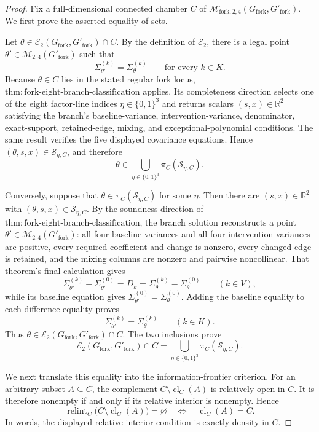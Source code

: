 \documentclass{article}
\begin{document}
\begin{proof}
Fix a full-dimensional connected chamber \(C\) of
\(\mathcal M^{\circ}_{\mathrm{fork},2,4}(G_{\mathrm{fork}},G'_{\mathrm{fork}})\).
We first prove the asserted equality of sets.

Let
\(\theta\in\mathcal E_2(G_{\mathrm{fork}},G'_{\mathrm{fork}})\cap C\).
By the definition of \(\mathcal E_2\), there is a legal point
\(\theta'\in\mathcal M_{2,4}(G'_{\mathrm{fork}})\) such that
\[
 \Sigma_{\theta'}^{(k)}=\Sigma_{\theta}^{(k)}
 \qquad\text{for every }k\in K.
\]
Because \(\theta\in C\) lies in the stated regular fork locus,
\(\mathrm{thm:fork\text{-}eight\text{-}branch\text{-}classification}\) applies.  Its
completeness direction selects one of the eight factor-line indices
\(\eta\in\{0,1\}^3\) and returns scalars \((s,x)\in\mathbb R^2\) satisfying
the branch's baseline-variance, intervention-variance, denominator,
exact-support, retained-edge, mixing, and exceptional-polynomial conditions.
The same result verifies the five displayed covariance equations.  Hence
\((\theta,s,x)\in\mathscr S_{\eta,C}\), and therefore
\[
 \theta\in
 \bigcup_{\eta\in\{0,1\}^3}\pi_C(\mathscr S_{\eta,C}).
\]

Conversely, suppose that
\(\theta\in\pi_C(\mathscr S_{\eta,C})\) for some \(\eta\).  Then there are
\((s,x)\in\mathbb R^2\) with \((\theta,s,x)\in\mathscr S_{\eta,C}\).
By the soundness direction of
\(\mathrm{thm:fork\text{-}eight\text{-}branch\text{-}classification}\), the
branch solution reconstructs a point
\(\theta'\in\mathcal M_{2,4}(G'_{\mathrm{fork}})\): all four baseline
variances and all four intervention variances are positive, every required
coefficient and change is nonzero, every changed edge is retained, and the
mixing columns are nonzero and pairwise noncollinear.  That theorem's final
calculation gives
\[
 \Sigma_{\theta'}^{(k)}-\Sigma_{\theta'}^{(0)}
 =D_k
 =\Sigma_{\theta}^{(k)}-\Sigma_{\theta}^{(0)}
 \qquad(k\in V),
\]
while its baseline equation gives
\(\Sigma_{\theta'}^{(0)}=\Sigma_{\theta}^{(0)}\).  Adding the baseline
equality to each difference equality proves
\[
 \Sigma_{\theta'}^{(k)}=\Sigma_{\theta}^{(k)}
 \qquad(k\in K).
\]
Thus \(\theta\in\mathcal E_2(G_{\mathrm{fork}},G'_{\mathrm{fork}})\cap C\).
The two inclusions prove
\[
 \mathcal E_2(G_{\mathrm{fork}},G'_{\mathrm{fork}})\cap C
 =\bigcup_{\eta\in\{0,1\}^3}\pi_C(\mathscr S_{\eta,C}).
\]

We next translate this equality into the information-frontier criterion.
For an arbitrary subset \(A\subseteq C\), the complement
\(C\setminus\operatorname{cl}_C(A)\) is relatively open in \(C\).  It is
therefore nonempty if and only if its relative interior is nonempty.  Hence
\[
 \operatorname{relint}_C\bigl(C\setminus\operatorname{cl}_C(A)\bigr)
 =\varnothing
 \quad\Longleftrightarrow\quad
 \operatorname{cl}_C(A)=C.
\]
In words, the displayed relative-interior condition is exactly density in
\(C\).


\end{proof}
\end{document}
